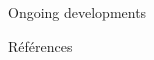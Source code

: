 \documentclass[final, hyperref, table]{beamer}
\begin{document}
\begin{frame}[containsverbatim]{}
\begin{columns}[T]
\begin{column}[T]{.49\linewidth}
\begin{block}{Ongoing developments}
\begin{multicols}{2}[]
\begin{itemize}
\end{itemize}
\end{multicols}
\end{block}

\begin{block}{Références}\tiny

\vspace{-1cm}
\begin{multicols}{2}[]

\end{multicols}
\end{block}
  
\end{column}
\end{columns}
\end{frame}
\end{document}
